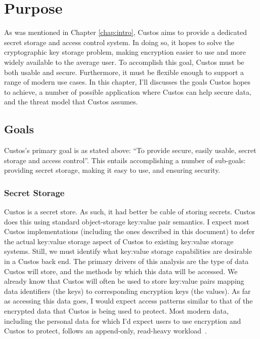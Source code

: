 \chapter{Purpose}
\label{chap:purpose}

As was mentioned in Chapter \ref{chap:intro}, Custos aims to provide a
dedicated secret storage and access control system. In doing so, it
hopes to solve the cryptographic key storage problem, making
encryption easier to use and more widely available to the average
user. To accomplish this goal, Custos must be both usable and secure.
Furthermore, it must be flexible enough to support a range of modern
use cases. In this chapter, I'll discusses the goals Custos hopes to
achieve, a number of possible application where Custos can help secure
data, and the threat model that Custos assumes.

\section{Goals}

Custos's primary goal is as stated above: ``To provide secure, easily
usable, secret storage and access control''. This entails
accomplishing a number of sub-goals: providing secret storage, making
it easy to use, and ensuring security.

\subsection{Secret Storage}

Custos is a secret store. As such, it had better be cable of storing
secrets. Custos does this using standard object-storage key:value pair
semantics. I expect most Custos implementations (including the ones
described in this document) to defer the actual key:value storage
aspect of Custos to existing key:value storage systems. Still, we must
identify what key:value storage capabilities are desirable in a Custos
back end. The primary drivers of this analysis are the type of data
Custos will store, and the methods by which this data will be
accessed. We already know that Custos will often be used to store
key:value pairs mapping data identifiers (the keys) to corresponding
encryption keys (the values). As far as accessing this data goes, I
would expect access patterns similar to that of the encrypted data
that Custos is being used to protect. Most modern data, including the
personal data for which I'd expect users to use encryption and Custos
to protect, follows an append-only, read-heavy
workload~\cite{Ghemawat2003}.

